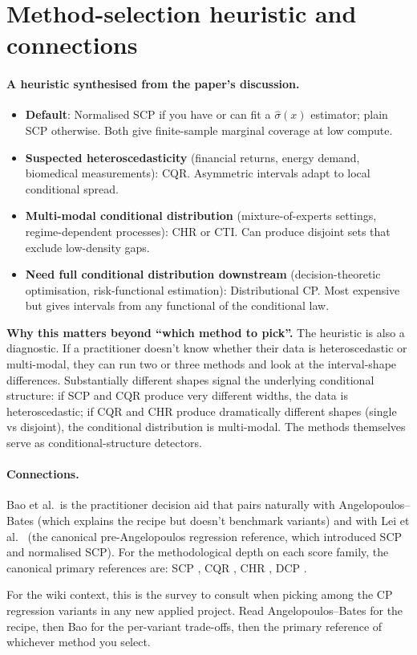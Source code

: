 \documentclass[letterpaper,11pt,leqno]{article}
\newcommand{\bib}{paper.bib}
\begin{document}
\section{Method-selection heuristic and connections}\label{s:practice}

\paragraph{A heuristic synthesised from the paper's discussion.}

\begin{itemize}
\item \textbf{Default}: Normalised SCP if you have or can fit a $\hat{\sigma}(x)$ estimator; plain SCP otherwise. Both give finite-sample marginal coverage at low compute.
\item \textbf{Suspected heteroscedasticity} (financial returns, energy demand, biomedical measurements): CQR. Asymmetric intervals adapt to local conditional spread.
\item \textbf{Multi-modal conditional distribution} (mixture-of-experts settings, regime-dependent processes): CHR or CTI. Can produce disjoint sets that exclude low-density gaps.
\item \textbf{Need full conditional distribution downstream} (decision-theoretic optimisation, risk-functional estimation): Distributional CP. Most expensive but gives intervals from any functional of the conditional law.
\end{itemize}

\begin{whymatters}
\textbf{Why this matters beyond ``which method to pick''.} The heuristic is also a diagnostic. If a practitioner doesn't know whether their data is heteroscedastic or multi-modal, they can run two or three methods and look at the interval-shape differences. Substantially different shapes signal the underlying conditional structure: if SCP and CQR produce very different widths, the data is heteroscedastic; if CQR and CHR produce dramatically different shapes (single vs disjoint), the conditional distribution is multi-modal. The methods themselves serve as conditional-structure detectors.
\end{whymatters}

\paragraph{Connections.} Bao et al.~is the practitioner decision aid that pairs naturally with Angelopoulos--Bates \cite{angelopoulos2022gentle} (which explains the recipe but doesn't benchmark variants) and with Lei et al.~\cite{lei2018distribution} (the canonical pre-Angelopoulos regression reference, which introduced SCP and normalised SCP). For the methodological depth on each score family, the canonical primary references are: SCP \cite{lei2018distribution}, CQR \cite{romano2019cqr}, CHR \cite{sesia2021chr}, DCP \cite{chernozhukov2021distributional}.

For the wiki context, this is the survey to consult when picking among the CP regression variants in any new applied project. Read Angelopoulos--Bates for the recipe, then Bao for the per-variant trade-offs, then the primary reference of whichever method you select.


\end{document}
